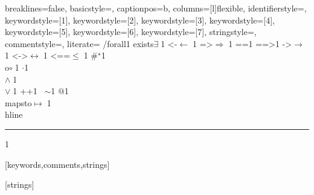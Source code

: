 {    breaklines=false,
    basicstyle=\scriptsize,
    captionpos=b,
    columns=[l]flexible,
    identifierstyle={\ttfamily\color{fg0}},
    keywordstyle=[1]{\ttfamily\color{dkpurple}},
    keywordstyle=[2]{\ttfamily\color{ltgreen}},
    keywordstyle=[3]{\ttfamily\color{ltred}},
    keywordstyle=[4]{\ttfamily\color{dkblue}},
    keywordstyle=[5]{\ttfamily\color{ltred}},
    keywordstyle=[6]{\ttfamily\color{ltaqua}},
    keywordstyle=[7]{\ttfamily\color{dkred}},
    stringstyle=\ttfamily,
    commentstyle={\ttfamily\color{ltgrey}},
    literate=
    {/forall}{{\color{dkgreen}{$\forall\;$}}}1
    {exists}{{$\exists\;$}}1
    {<-}{{$\leftarrow\;$}}1
    {=>}{{$\Rightarrow\;$}}1
    {==}{{\code{==}\;}}1
    {==>}{{\code{==>}\;}}1
    {->}{{$\rightarrow\;$}}1
    {<->}{{$\leftrightarrow\;$}}1
    {<==}{{$\leq\;$}}1
    {\#}{{$^\star$}}1 
    {\\o}{{$\circ\;$}}1 
    {\@}{{$\cdot$}}1 
    {\/\\}{{$\wedge\;$}}1
    {\\\/}{{$\vee\;$}}1
    {++}{{\code{++}}}1
    {~}{{$\sim$}}1
    {\@\@}{{$@$}}1
    {\\mapsto}{{$\mapsto\;$}}1
    {\\hline}{{\rule{\linewidth}{0.5pt}}}1
}[keywords,comments,strings]

[strings]
